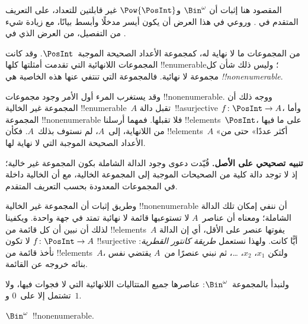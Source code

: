 \documentclass[../../../include/open-logic-section]{subfiles}
\begin{document}


\begin{editorial}
المقصود هنا إثبات أن $\Bin^\omega$ و$\Pow{\PosInt}$ غير قابلتين للتعداد، على التعريف المتقدم في . وروعي في هذا العرض أن يكون أيسر مدخلًا وأبسط بيانًا، مع زيادة شيء من التفصيل، من العرض الذي في .
\end{editorial}

من المجموعات ما لا نهاية له، كمجموعة الأعداد الصحيحة الموجبة~$\PosInt$. وقد كانت المجموعات اللانهائية التي تقدمت أمثلتها كلها !!{enumerable}؛ وليس ذلك شأن كل مجموعة لا نهائية. فالمجموعة التي تنتفي عنها هذه الخاصية هي \emph{!!{nonenumerable}}.

وقد يستغرب المرء أول الأمر وجود مجموعات !!{nonenumerable}. ووجه ذلك أن المجموعة غير الخالية !!{enumerable}~$A$ تقبل دالة~!!a{surjective} $f \colon \PosInt \to A$، وأما المجموعة !!{nonenumerable} فلا تقبلها. فمهما أرسلنا !!{element}s~$\PosInt$، على ما فيها من اللانهاية، إلى~$A$، لم نستوف بذلك~$A$. فكأن !!{element}s~$A$ «أكثر عددًا» حتى من الأعداد الصحيحة الموجبة التي لا نهاية لها.

\textbf{تنبيه تصحيحي على الأصل.} قُيّدت دعوى وجود الدالة الشاملة بكون
المجموعة غير خالية؛ إذ لا توجد دالة كلية من الصحيحات الموجبة إلى المجموعة الخالية،
مع أن الخالية داخلة في المجموعات المعدودة بحسب التعريف المتقدم.

وطريق إثبات أن المجموعة غير الخالية !!{nonenumerable} أن ننفي إمكان تلك الدالة الشاملة؛ ومعناه أن عناصر~$A$ لا تستوعبها قائمة لا نهائية تمتد في جهة واحدة. ويكفينا لذلك أن نبين أن كل قائمة من !!{element}s~$A$ يفوتها عنصر على الأقل، أي إن الدالة $f\colon \PosInt \to A$ لا تكون !!{surjective} أيًّا كانت. ولهذا نستعمل \emph{طريقة كانتور القطرية}: نأخذ قائمة من !!{element}s~$A$، ولتكن $x_1$، $x_2$، \dots، ثم نبني عنصرًا من~$A$ يقتضي نفس بنائه خروجه عن القائمة.

ولنبدأ بالمجموعة~$\Bin^\omega$: عناصرها جميع المتتاليات اللانهائية التي لا فجوات فيها، ولا تشتمل إلا على~$0$ و~$1$.

\begin{thm}
$\Bin^\omega$~!!{nonenumerable}.
\end{thm}
\end{document}
